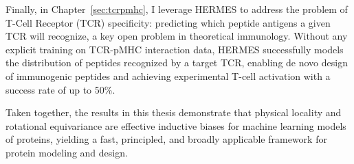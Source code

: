 Finally, in Chapter~\ref{sec:tcrpmhc}, I leverage HERMES to address the problem of T-Cell Receptor (TCR) specificity:
predicting which peptide antigens a given TCR will recognize, a key open problem in theoretical immunology.
Without any explicit training on TCR-pMHC interaction data, HERMES successfully models the distribution of peptides
recognized by a target TCR, enabling de novo design of immunogenic peptides and achieving experimental T-cell activation
with a success rate of up to 50\%.

Taken together, the results in this thesis demonstrate that physical locality and rotational equivariance are effective
inductive biases for machine learning models of proteins, yielding a fast, principled, and broadly applicable framework
for protein modeling and design.
